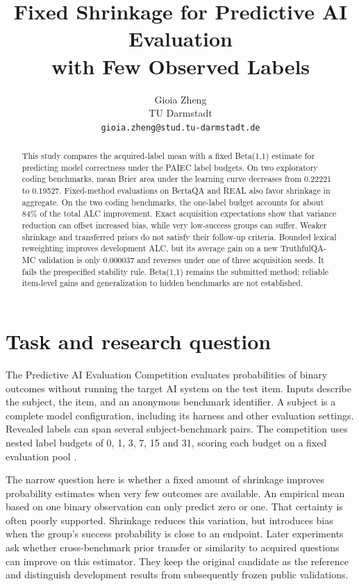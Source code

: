 \documentclass{article}
\title{Fixed Shrinkage for Predictive AI Evaluation\\with Few Observed Labels}
\author{Gioia Zheng\\TU Darmstadt\\\texttt{gioia.zheng@stud.tu-darmstadt.de}}
\begin{document}
\maketitle
\begin{abstract}
This study compares the acquired-label mean with a fixed Beta(1,1) estimate for predicting model correctness under the PAIEC label budgets. On two exploratory coding benchmarks, mean Brier area under the learning curve decreases from 0.22221 to 0.19527. Fixed-method evaluations on BertaQA and REAL also favor shrinkage in aggregate. On the two coding benchmarks, the one-label budget accounts for about 84\% of the total ALC improvement. Exact acquisition expectations show that variance reduction can offset increased bias, while very low-success groups can suffer. Weaker shrinkage and transferred priors do not satisfy their follow-up criteria. Bounded lexical reweighting improves development ALC, but its average gain on a new TruthfulQA-MC validation is only 0.000037 and reverses under one of three acquisition seeds. It fails the prespecified stability rule. Beta(1,1) remains the submitted method; reliable item-level gains and generalization to hidden benchmarks are not established.
\end{abstract}
\section{Task and research question}\label{task-and-research-question}

The Predictive AI Evaluation Competition evaluates probabilities of binary outcomes without running the target AI system on the test item. Inputs describe the subject, the item, and an anonymous benchmark identifier. A subject is a complete model configuration, including its harness and other evaluation settings. Revealed labels can span several subject-benchmark pairs. The competition uses nested label budgets of 0, 1, 3, 7, 15 and 31, scoring each budget on a fixed evaluation pool \cite{ref1}.

The narrow question here is whether a fixed amount of shrinkage improves probability estimates when very few outcomes are available. An empirical mean based on one binary observation can only predict zero or one. That certainty is often poorly supported. Shrinkage reduces this variation, but introduces bias when the group's success probability is close to an endpoint. Later experiments ask whether cross-benchmark prior transfer or similarity to acquired questions can improve on this estimator. They keep the original candidate as the reference and distinguish development results from subsequently frozen public validations.
\end{document}
